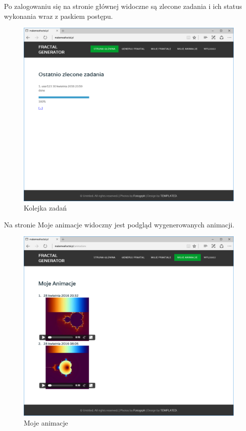 \documentclass[a4paper]{article}
\begin{document}
\newpage
Po zalogowaniu się na stronie głównej widoczne są zlecone zadania i ich status wykonania wraz z paskiem postępu.
\begin{figure}[H]
    \centering
    \includegraphics[width=\textwidth]{queue_page.png}
    \caption{Kolejka zadań}
    \label{fig:queue_page}
\end{figure}
\newpage
Na stronie Moje animacje widoczny jest podgląd wygenerowanych animacji.
\begin{figure}[H]
    \centering
    \includegraphics[width=\textwidth]{my_frac.png}
    \caption{Moje animacje}
    \label{fig:my_frac}
\end{figure}
\end{document}
